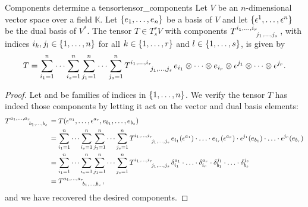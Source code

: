 \begin{proposition}{Components determine a tensor}{tensor_components}
    Let \(V\) be an \(n\)-dimensional vector space over a field \(\mathbb{K}\). Let \(\{e_1, \dots, e_n\}\) be a basis of \(V\) and let \(\{\epsilon^1, \dots, \epsilon^n\}\) be the dual basis of \(V ^{\ast}\). The tensor \(T \in T_s^rV\) with components \(T\indices{^{i_1, \dots, i_r}_{j_1, \dots, j_s}}\), with indices \(i_k, j_l \in \{1, \dots, n\}\) for all \(k \in \{1, \dots, r\}\) and \(l \in \{1, \dots, s\}\), is given by
    \begin{equation*}
        T = \sum_{i_1 = 1}^{n} \dots \sum_{i_s = 1}^{n} \sum_{j_1 = 1}^{n}\dots \sum_{j_s = 1}^n T\indices{^{i_1, \dots, i_r}_{j_1, \dots, j_s}} e_{i_1} \otimes \dots \otimes e_{i_r} \otimes \epsilon^{j_1} \otimes \dots \otimes \epsilon^{j_r}.
    \end{equation*}
\end{proposition}
\begin{proof}
    Let  and  be families of indices in \(\{1, \dots, n\}\). We verify the tensor \(T\) has indeed those components by letting it act on the vector and dual basis elements:
    \begin{align*}
        T\indices{^{a_1, \dots, a_r}_{b_1, \dots, b_s}} &= T(\epsilon^{a_1}, \dots, \epsilon^{a_r}, e_{b_1}, \dots, e_{b_s})\\
                                                        &= \sum_{i_1 = 1}^{n} \dots \sum_{i_s = 1}^{n} \sum_{j_1 = 1}^{n}\dots \sum_{j_s = 1}^n T\indices{^{i_1, \dots, i_r}_{j_1, \dots, j_s}} e_{i_1}(\epsilon^{a_1}) \cdot \dotso \cdot e_{i_r}(\epsilon^{a_r}) \cdot \epsilon^{j_1}(e_{b_1}) \cdot \dotso \cdot \epsilon^{j_r}(e_{b_r})\\
                                                        &= \sum_{i_1 = 1}^{n} \dots \sum_{i_s = 1}^{n} \sum_{j_1 = 1}^{n}\dots \sum_{j_s = 1}^n T\indices{^{i_1, \dots, i_r}_{j_1, \dots, j_s}} \delta^{a_1}_{i_1}\cdot \dotso \cdot \delta^{a_r}_{i_r}\cdot \delta^{j_1}_{b_1}\cdot \dotso \cdot \delta^{j_s}_{b_s}\\
                                                        &= T\indices{^{a_1, \dots, a_r}_{b_1, \dots, b_s}},
    \end{align*}
    and we have recovered the desired components.
\end{proof}

